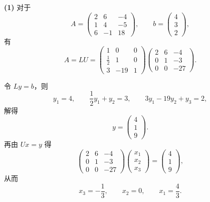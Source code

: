 \documentclass[11pt, a4paper]{ctexart}
\begin{document}
\begin{solution}
    \textbf{(1)} 对于
    \[
        A =
        \begin{pmatrix}
            2 & 6 & -4 \\
            1 & 4 & -5 \\
            6 & -1 & 18
        \end{pmatrix},
        \qquad
        b =
        \begin{pmatrix}
            4 \\
            3 \\
            2
        \end{pmatrix},
    \]
    有
    \[
        A = LU =
        \begin{pmatrix}
            1 & 0 & 0 \\
            \frac{1}{2} & 1 & 0 \\
            3 & -19 & 1
        \end{pmatrix}
        \begin{pmatrix}
            2 & 6 & -4 \\
            0 & 1 & -3 \\
            0 & 0 & -27
        \end{pmatrix}.
    \]

    令 $Ly = b$，则
    \[
        y_1 = 4,\qquad
        \frac{1}{2} y_1 + y_2 = 3,\qquad
        3y_1 - 19y_2 + y_3 = 2,
    \]
    解得
    \[
        y =
        \begin{pmatrix}
            4 \\
            1 \\
            9
        \end{pmatrix}.
    \]
    再由 $Ux = y$ 得
    \[
        \begin{pmatrix}
            2 & 6 & -4 \\
            0 & 1 & -3 \\
            0 & 0 & -27
        \end{pmatrix}
        \begin{pmatrix}
            x_1 \\
            x_2 \\
            x_3
        \end{pmatrix}
        =
        \begin{pmatrix}
            4 \\
            1 \\
            9
        \end{pmatrix},
    \]
    从而
    \[
        x_3 = -\frac{1}{3},\qquad x_2 = 0,\qquad x_1 = \frac{4}{3}.
    \]


\end{solution}
\end{document}
